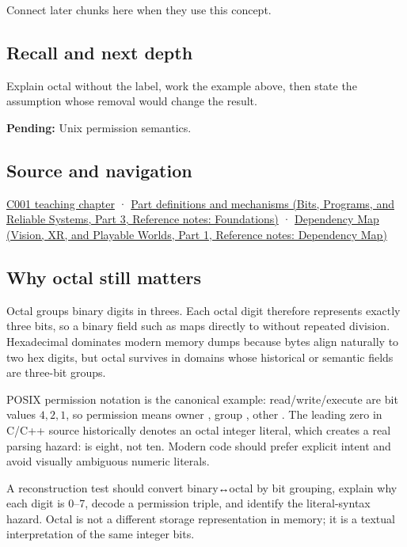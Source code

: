 Connect later chunks here when they use this concept.

\subsection{Recall and next depth}\label{appendix-17fc1bc8b305-recall-and-next-depth}

\hypertarget{appendix-17fc1bc8b305-recall-and-next-depth}{}

Explain octal without the label, work the example above, then state the assumption whose removal would change the result.

\textbf{Pending:} Unix permission semantics.

\subsection{Source and navigation}\label{appendix-17fc1bc8b305-source-and-navigation}

\hypertarget{appendix-17fc1bc8b305-source-and-navigation}{}

\hyperref[01-foundations-i-ch001-from-a-signal-to-an-interpretation]{C001 teaching chapter} · \href{../01-Bits-Programs-and-Reliable-Systems-P03/main.pdf\#nameddest=appendix-fd090d982a15}{Part definitions and mechanisms (Bits, Programs, and Reliable Systems, Part 3, Reference notes: Foundations)} · \href{../07-Vision-XR-and-Playable-Worlds-P01/main.pdf\#nameddest=appendix-4ad47bdd269a}{Dependency Map (Vision, XR, and Playable Worlds, Part 1, Reference notes: Dependency Map)}

\subsection{Why octal still matters}\label{appendix-17fc1bc8b305-why-octal-still-matters}

\hypertarget{appendix-17fc1bc8b305-why-octal-still-matters}{}

Octal groups binary digits in threes. Each octal digit therefore represents exactly three bits, so a binary field such as  maps directly to  without repeated division. Hexadecimal dominates modern memory dumps because bytes align naturally to two hex digits, but octal survives in domains whose historical or semantic fields are three-bit groups.

POSIX permission notation is the canonical example: read/write/execute are bit values \(4,2,1\), so permission  means owner , group , other . The leading zero in C/C++ source historically denotes an octal integer literal, which creates a real parsing hazard:  is eight, not ten. Modern code should prefer explicit intent and avoid visually ambiguous numeric literals.

A reconstruction test should convert binary↔octal by bit grouping, explain why each digit is 0--7, decode a permission triple, and identify the literal-syntax hazard. Octal is not a different storage representation in memory; it is a textual interpretation of the same integer bits.

